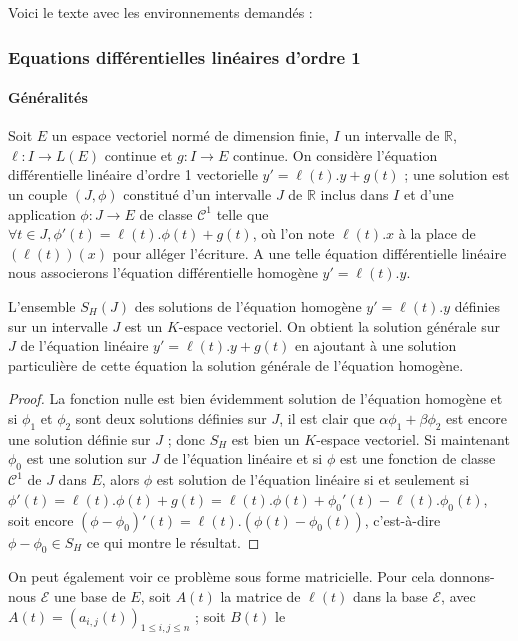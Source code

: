 Voici le texte avec les environnements demandés :
\subsubsection{Equations différentielles linéaires d'ordre 1}
\paragraph{Généralités}
Soit $E$ un espace vectoriel normé de dimension finie, $I$ un intervalle de
$\mathbb{R}$, $\ell : I \rightarrow L(E)$ continue et $g : I \rightarrow E$ continue. On considère l'équation
différentielle linéaire d'ordre 1 vectorielle $y' = \ell(t).y + g(t)$ ; une
solution est un couple $(J,\phi)$ constitué d'un intervalle $J$ de $\mathbb{R}$ inclus
dans $I$ et d'une application $\phi : J \rightarrow E$ de classe $\mathcal{C}^1$ telle que
$\forall t \in J, \phi'(t) = \ell(t).\phi(t) + g(t)$, où l'on note
$\ell(t).x$ à la place de $(\ell(t))(x)$ pour alléger l'écriture. A une telle équation différentielle
linéaire nous associerons l'équation différentielle homogène $y' = \ell(t).y$.
\begin{thm}
L'ensemble $S_H(J)$ des solutions de l'équation
homogène $y' = \ell(t).y$ définies sur un intervalle $J$ est un $K$-espace
vectoriel. On obtient la solution générale sur $J$ de l'équation linéaire
$y' = \ell(t).y + g(t)$ en ajoutant à une solution particulière de cette
équation la solution générale de l'équation homogène.
\end{thm}
\begin{proof}
La fonction nulle est bien évidemment solution de
l'équation homogène et si $\phi_1$ et $\phi_2$ sont deux
solutions définies sur $J$, il est clair que $\alpha \phi_1 + \beta \phi_2$
est encore une solution définie sur $J$ ; donc $S_H$ est bien un $K$-espace vectoriel. Si maintenant $\phi_0$ est une solution sur $J$ de
l'équation linéaire et si $\phi$ est une fonction de classe $\mathcal{C}^1$ de
$J$ dans $E$, alors $\phi$ est solution de l'équation linéaire si et seulement
si $\phi'(t) = \ell(t).\phi(t) + g(t) = \ell(t).\phi(t) + \phi_0'(t) -
\ell(t).\phi_0(t)$, soit encore $(\phi - \phi_0)'(t) = \ell(t).(\phi(t) -
\phi_0(t))$, c'est-à-dire $\phi - \phi_0 \in S_H$ ce qui
montre le résultat.
\end{proof}
On peut également voir ce problème sous forme matricielle. Pour cela
donnons-nous $\mathcal{E}$ une base de $E$, soit $A(t)$ la matrice de $\ell(t)$ dans la base
$\mathcal{E}$, avec $A(t) = (a_{i,j}(t))_{1 \leq i,j \leq n}$ ; soit $B(t)$ le
